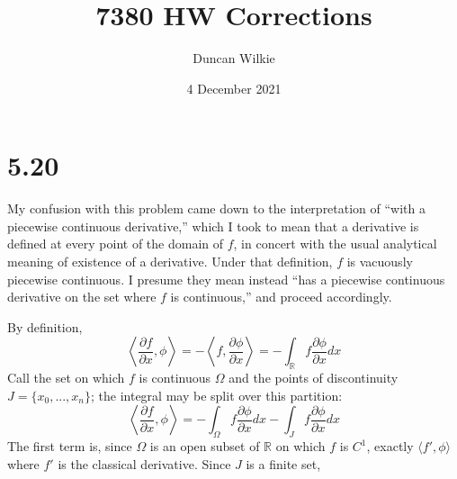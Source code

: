 \documentclass{article}
\title{7380 HW Corrections}
\author{Duncan Wilkie}
\date{4 December 2021}
\begin{document}
\maketitle

\section*{5.20}
My confusion with this problem came down to the interpretation of ``with a piecewise continuous derivative,'' which I took to mean that a derivative is defined at every point of the domain of $f$, in concert with the usual analytical meaning of existence of a derivative. Under that definition, $f$ is vacuously piecewise continuous. I presume they mean instead ``has a piecewise continuous derivative on the set where $f$ is continuous,'' and proceed accordingly.

By definition,
\[\left\langle\frac{\partial f}{\partial x}, \phi\right\rangle=-\left\langle f, \frac{\partial \phi}{\partial x} \right\rangle=-\int_\mathbb{R} f\frac{\partial \phi}{\partial x}dx\]
Call the set on which $f$ is continuous $\Omega$ and the points of discontinuity $J=\{x_0,...,x_n\}$; the integral may be split over this partition:
\[\left\langle\frac{\partial f}{\partial x},\phi \right\rangle=-\int_\Omega f\frac{\partial \phi}{\partial x}dx - \int_Jf \frac{\partial \phi}{\partial x}dx\]
The first term is, since $\Omega$ is an open subset of $\mathbb{R}$ on which $f$ is $C^1$, exactly $\langle f', \phi \rangle$ where $f'$ is the classical derivative. Since $J$ is a finite set,
\end{document}
